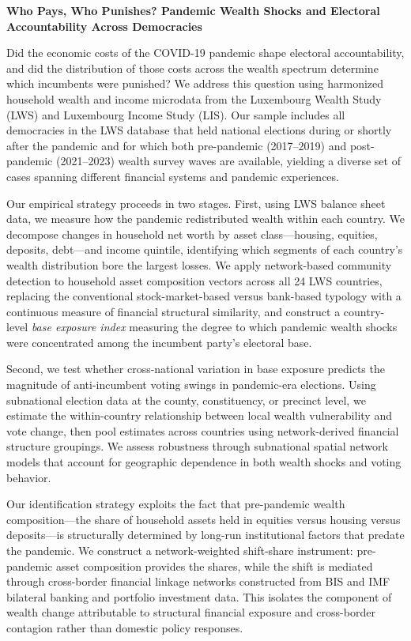 \documentclass[12pt]{article}
\begin{document}
\textbf{Who Pays, Who Punishes? Pandemic Wealth Shocks and Electoral Accountability Across Democracies}

\bigskip

Did the economic costs of the COVID-19 pandemic shape electoral accountability, and did the distribution of those costs across the wealth spectrum determine which incumbents were punished? We address this question using harmonized household wealth and income microdata from the Luxembourg Wealth Study (LWS) and Luxembourg Income Study (LIS). Our sample includes all democracies in the LWS database that held national elections during or shortly after the pandemic and for which both pre-pandemic (2017--2019) and post-pandemic (2021--2023) wealth survey waves are available, yielding a diverse set of cases spanning different financial systems and pandemic experiences.

Our empirical strategy proceeds in two stages. First, using LWS balance sheet data, we measure how the pandemic redistributed wealth within each country. We decompose changes in household net worth by asset class---housing, equities, deposits, debt---and income quintile, identifying which segments of each country's wealth distribution bore the largest losses. We apply network-based community detection to household asset composition vectors across all 24 LWS countries, replacing the conventional stock-market-based versus bank-based typology with a continuous measure of financial structural similarity, and construct a country-level \textit{base exposure index} measuring the degree to which pandemic wealth shocks were concentrated among the incumbent party's electoral base.

Second, we test whether cross-national variation in base exposure predicts the magnitude of anti-incumbent voting swings in pandemic-era elections. Using subnational election data at the county, constituency, or precinct level, we estimate the within-country relationship between local wealth vulnerability and vote change, then pool estimates across countries using network-derived financial structure groupings. We assess robustness through subnational spatial network models that account for geographic dependence in both wealth shocks and voting behavior.

Our identification strategy exploits the fact that pre-pandemic wealth composition---the share of household assets held in equities versus housing versus deposits---is structurally determined by long-run institutional factors that predate the pandemic. We construct a network-weighted shift-share instrument: pre-pandemic asset composition provides the shares, while the shift is mediated through cross-border financial linkage networks constructed from BIS and IMF bilateral banking and portfolio investment data. This isolates the component of wealth change attributable to structural financial exposure and cross-border contagion rather than domestic policy responses.
\end{document}

